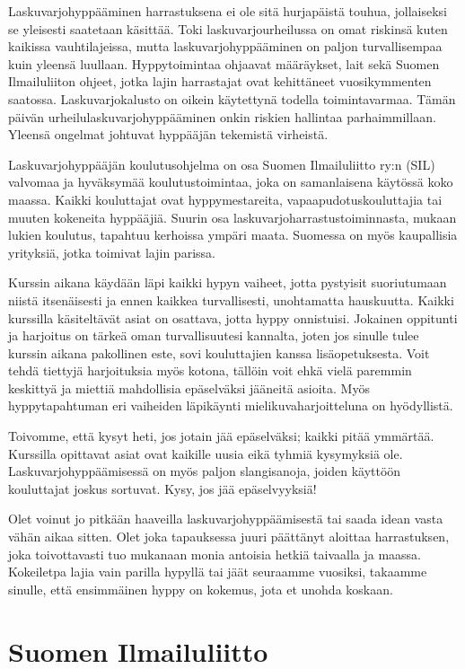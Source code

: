 
Laskuvarjohyppääminen harrastuksena ei ole sitä hurjapäistä touhua, jollaiseksi se yleisesti saatetaan käsittää. Toki laskuvarjourheilussa on omat riskinsä kuten kaikissa vauhtilajeissa, mutta laskuvarjohyppääminen on paljon turvallisempaa kuin yleensä luullaan. Hyppytoimintaa ohjaavat määräykset, lait sekä Suomen Ilmailuliiton ohjeet, jotka lajin harrastajat ovat kehittäneet vuosikymmenten saatossa. Laskuvarjokalusto on oikein käytettynä todella toimintavarmaa. Tämän päivän urheilulaskuvarjohyppääminen onkin riskien hallintaa parhaimmillaan. Yleensä ongelmat johtuvat hyppääjän tekemistä virheistä. 


Laskuvarjohyppääjän koulutusohjelma on osa Suomen Ilmailuliitto ry:n (SIL) valvomaa ja hyväksymää koulutustoimintaa, joka on samanlaisena käytössä koko maassa. Kaikki kouluttajat ovat hyppymestareita, vapaapudotuskouluttajia tai muuten kokeneita hyppääjiä. Suurin osa laskuvarjoharrastustoiminnasta, mukaan lukien koulutus, tapahtuu kerhoissa ympäri maata. Suomessa on myös kaupallisia yrityksiä, jotka toimivat lajin parissa.  


Kurssin aikana käydään läpi kaikki hypyn vaiheet, jotta pystyisit suoriutumaan niistä itsenäisesti ja ennen kaikkea turvallisesti, unohtamatta hauskuutta. Kaikki kurssilla käsiteltävät asiat on osattava, jotta hyppy onnistuisi. Jokainen oppitunti ja harjoitus on tärkeä oman turvallisuutesi kannalta, joten jos sinulle tulee kurssin aikana pakollinen este, sovi kouluttajien kanssa lisäopetuksesta. Voit tehdä tiettyjä harjoituksia myös kotona, tällöin voit ehkä vielä paremmin keskittyä ja miettiä mahdollisia epäselväksi jääneitä asioita. Myös hyppytapahtuman eri vaiheiden läpikäynti mielikuvaharjoitteluna on hyödyllistä.  


Toivomme, että kysyt heti, jos jotain jää epäselväksi; kaikki pitää ymmärtää. Kurssilla opittavat asiat ovat kaikille uusia eikä tyhmiä kysymyksiä ole. Laskuvarjohyppäämisessä on myös paljon slangisanoja, joiden käyttöön kouluttajat joskus sortuvat. Kysy, jos jää epäselvyyksiä! 


Olet voinut jo pitkään haaveilla laskuvarjohyppäämisestä tai saada idean vasta vähän aikaa sitten. Olet joka tapauksessa juuri päättänyt aloittaa harrastuksen, joka toivottavasti tuo mukanaan monia antoisia hetkiä taivaalla ja maassa. Kokeiletpa lajia vain parilla hypyllä tai jäät seuraamme vuosiksi, takaamme sinulle, että ensimmäinen hyppy on kokemus, jota et unohda koskaan. 

\section{ Suomen Ilmailuliitto }
\label{tervetuloa-taivaalle-suomen-ilmailuliitto}


